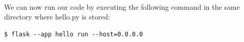 \documentclass[12pt, a4paper, oneside]{book}
\begin{document}



\paragraph{} We can now run our code by executing the following command in the same directory where hello.py is stored:

\begin{lstlisting}[style=DOS]
    $ flask --app hello run --host=0.0.0.0
\end{lstlisting}
\end{document}
